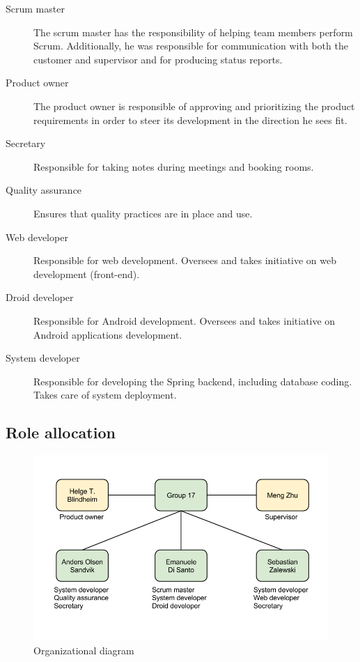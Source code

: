 \begin{description}

\item[Scrum master]
The scrum master has the responsibility of helping team members perform Scrum.
Additionally, he was responsible for communication with both the customer and supervisor
and for producing status reports.
\item[Product owner]
The product owner is responsible of approving and prioritizing the product
requirements in order to steer its development in the direction he sees fit.
\item[Secretary]
Responsible for taking notes during meetings and booking rooms.
\item[Quality assurance]
Ensures that quality practices are in place and use.
\item[Web developer]
Responsible for web development. Oversees and takes initiative on web development (front-end).
\item[Droid developer]
Responsible for Android development. Oversees and takes initiative on Android applications development.
\item[System developer]
Responsible for developing the Spring backend, including database coding. Takes care of system deployment.
\end{description}

\subsection{Role allocation}

\begin{figure}[H]
\includegraphics[scale=0.5]{../Figures/organizational-diagram.png}
\caption{Organizational diagram}
\label{figure:orgdia}
\end{figure}

